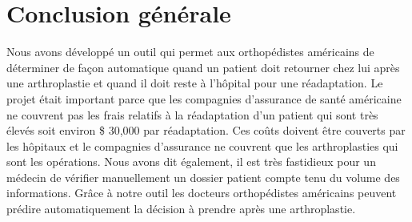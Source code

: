 \documentclass[12pt, french]{report}
\begin{document}
%
%
%



\newpage

\chapter{Conclusion générale}

Nous avons développé un outil qui permet aux orthopédistes américains de déterminer de façon automatique quand un patient doit retourner chez lui après une arthroplastie et quand il doit reste à l'hôpital pour une réadaptation. Le projet était important parce que les compagnies d'assurance de santé américaine ne couvrent pas les frais relatifs à la réadaptation d'un patient qui sont très élevés soit environ \$ 30,000 par réadaptation. Ces coûts doivent être couverts par les hôpitaux et le compagnies d'assurance ne couvrent que les arthroplasties qui sont les opérations. Nous avons dit également, il est très fastidieux pour un médecin de vérifier manuellement un dossier patient compte tenu du volume des informations. Grâce à notre outil les docteurs orthopédistes américains peuvent prédire automatiquement la décision à prendre après une arthroplastie.  \\    
\end{document}
